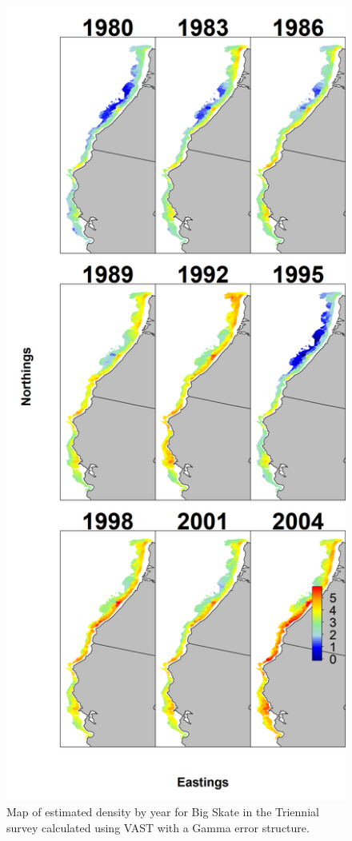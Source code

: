 \documentclass[12pt,]{article}
\begin{document}
\begin{figure}
\centering
\includegraphics{Figures/VAST_Yearly_Dens_Triennial.png}
\caption{Map of estimated density by year for Big Skate in the Triennial
survey calculated using VAST with a Gamma error
structure.\label{fig:VAST_Yearly_Dens_Triennial}}
\end{figure}
\end{document}
